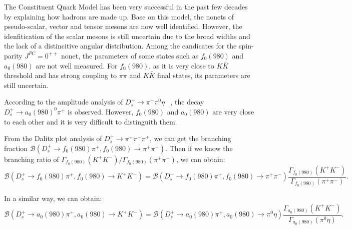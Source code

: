 \par{
    The Constituent Quark Model has been very successful in the past few decades by explaining how hadrons are made up.
    Base on this model, the nonets of pseudo-scalar, vector and tensor mesons are now well identified.
    However, the idenfitication of the scalar mesons is still uncertain due to the broad widths and the lack of a distincitive angular distribution.
    Among the candicates for the spin-parity $J^{PC}=0^{++}$ nonet, the parameters of some states such as $f_{0}(980)$ and $a_{0}(980)$ are not well measured.
    For $f_{0}(980)$, as it is very close to $K\bar{K}$ threshold and has strong coupling to $\pi\pi$ and $K\bar{K}$ final states, its parameters are still uncertain.
    
    
    According to the amplitude analysis of $D_{s}^{+} \rightarrow \pi^{+}\pi^{0}\eta$ ~\cite{Doc-DB-682-v7}, the decay $D_{s}^{+} \rightarrow a_{0}(980)^{0}\pi^{+}$ is observed.
    However, $f_{0}(980)$ and $a_{0}(980)$ are very close to each other and it is very difficult to distinguith them.
    
    
    From the Dalitz plot analysis of $D_{s}^{+} \rightarrow \pi^{+}\pi^{-}\pi^{+}$, we can get the branching fraction $\mathcal{B}(D_{s}^{+} \rightarrow f_{0}(980)\pi^{+}, f_{0}(980) \rightarrow \pi^{+}\pi^{-})$.
    Then if we know the branching ratio of $\Gamma_{f_{0}(980)}(K^{+}K^{-})/\Gamma_{f_{0}(980)}(\pi^{+}\pi^{-})$, we can obtain:
    \begin{equation}
            \mathcal{B}(D_{s}^{+} \rightarrow f_{0}(980)\pi^{+}, f_{0}(980) \rightarrow K^{+}K^{-}) =\mathcal{B}(D_{s}^{+} \rightarrow f_{0}(980)\pi^{+}, f_{0}(980) \rightarrow \pi^{+}\pi^{-})  \frac{\Gamma_{f_{0}(980)}(K^{+}K^{-})}{ \Gamma_{f_{0}(980)}(\pi^{+}\pi^{-})}. \label{bf-f0}
    \end{equation}
    
    In a similar way, we can obtain:
    \begin{equation}
            \mathcal{B}(D_{s}^{+} \rightarrow a_{0}(980)\pi^{+}, a_{0}(980) \rightarrow K^{+}K^{-}) =\mathcal{B}(D_{s}^{+} \rightarrow a_{0}(980)\pi^{+}, a_{0}(980) \rightarrow \pi^{0}\eta)  \frac{\Gamma_{a_{0}(980)}(K^{+}K^{-})}{ \Gamma_{a_{0}(980)}(\pi^{0}\eta)}. \label{bf-a0} 
    \end{equation}
    
}

